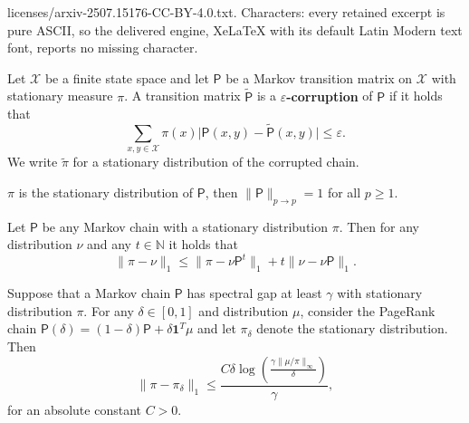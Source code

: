 \documentclass[10pt,a4paper]{amsart}
\begin{document}
licenses/arxiv-2507.15176-CC-BY-4.0.txt. Characters: every retained excerpt is pure ASCII, so the delivered engine, XeLaTeX with its default Latin Modern text font, reports no missing character.
\begin{defn}
\label{def:corruption}
    Let $\mathcal{X}$ be a finite state space and let $\mathsf{P}$ be a Markov transition matrix on $\mathcal{X}$ with stationary measure $\pi$. A transition matrix $\widetilde{\mathsf{P}}$ is a \textbf{$\varepsilon$-corruption} of $\mathsf{P}$ if it holds that
    \begin{equation*}
        \sum_{x,y\in \mathcal{X}}\pi(x)\vert \mathsf{P}(x,y)-\widetilde{\mathsf{P}}(x,y)\vert\leq \varepsilon.
    \end{equation*}
    We write $\widetilde{\pi}$ for a stationary distribution of the corrupted chain.
\end{defn}

\begin{fact}
\label{fact:contract}
    $\pi$ is the stationary distribution of $\mathsf{P}$, then $\|\mathsf{P}\|_{p\to p}=1$ for all $p\geq 1$.
\end{fact}

\begin{lem}
\label{lem:coupling_main}
    Let $\mathsf{P}$ be any Markov chain with a stationary distribution $\pi$. Then for any distribution $\nu$ and any $t\in \mathbb{N}$ it holds that
    \begin{equation*}
        \|\pi-\nu\|_1\leq \|\pi -\nu\mathsf{P}^t\|_1+t\|\nu-\nu\mathsf{P}\|_1.
    \end{equation*}
\end{lem}

\begin{cor}
\label{cor:pr_close}
Suppose that a Markov chain $\mathsf{P}$ has spectral gap at least $\gamma$ with stationary distribution $\pi$. For any $\delta\in [0,1]$ and distribution $\mu$, consider the PageRank chain $\mathsf{P}(\delta) = (1-\delta)\mathsf{P}+\delta\bm{1}^T\mu$ and let $\pi_{\delta}$ denote the stationary distribution. Then 
\begin{equation*}
    \|\pi-\pi_{\delta}\|_1\leq \frac{C\delta\log\left(\frac{\gamma\|\mu/\pi\|_{\infty}}{\delta}\right)}{\gamma},
\end{equation*}
for an absolute constant $C>0$.
\end{cor}
\end{document}

